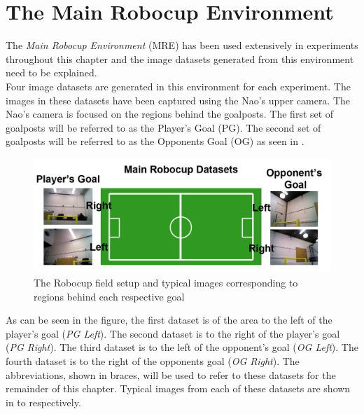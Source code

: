 \documentclass[11pt]{report}
\begin{document}
\section{The Main Robocup Environment}
\label{sec:datasets}
The \textit{Main Robocup Environment} (MRE) has been used extensively in experiments throughout this chapter and the image datasets generated from this environment need to be explained.\\

Four image datasets are generated in this environment for each experiment. The images in these datasets have been captured using the Nao's upper camera. The Nao's camera is focused on the regions behind the goalposts. The first set of goalposts will be referred to as the Player's Goal (PG). The second set of goalposts will be referred to as the Opponents Goal (OG) as seen in . \\


\begin{figure}%
  \centering
    \includegraphics[width=1.0\textwidth]{../Drawings/RobocupDataset/DatasetSetup.jpg}
    \caption{The Robocup field setup and typical images corresponding to regions behind each respective goal} 
    \label{fig:datasetSetup}
 \end{figure}


As can be seen in the figure, the first dataset is of the area to the left of the player's goal (\textit{PG Left}). The second dataset is to the right of the player's goal (\textit{PG Right}). The third dataset is to the left of the opponent's goal (\textit{OG Left}). The fourth dataset is to the right of the opponents goal (\textit{OG Right}). The abbreviations, shown in braces, will be used to refer to these datasets for the remainder of this chapter. Typical images from each of these datasets are shown in  to  respectively.\\
\end{document}
